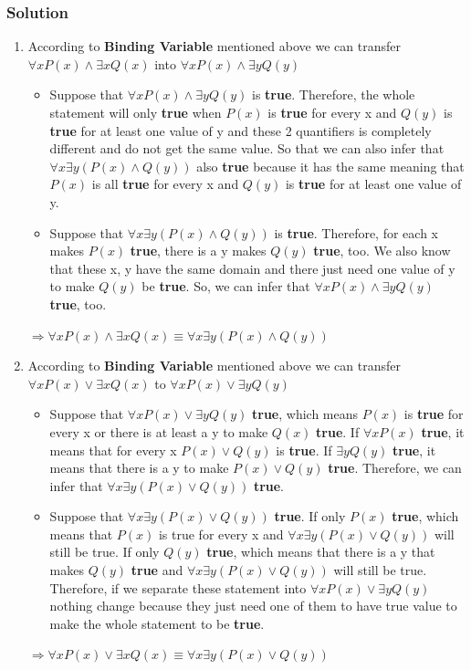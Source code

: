\documentclass{article}
\begin{document}
\subsubsection*{Solution}
\begin{enumerate} [label = (\alph*)]
    \item According to \textbf{Binding Variable} mentioned above we can transfer $\forall xP(x) \land \exists xQ(x)$ into $\forall xP(x) \land \exists yQ(y)$
          \begin{itemize}
              \item Suppose that $\forall xP(x) \land \exists yQ(y)$ is \textbf{true}. Therefore, the whole statement will only \textbf{true} when $P(x)$ is \textbf{true} for every x and $Q(y)$ is \textbf{true} for at least one value of y and these 2 quantifiers is completely different and do not get the same value. So that we can also infer that $\forall x\exists y(P(x) \land Q(y))$ also \textbf{true} because it has the same meaning that $P(x)$ is all \textbf{true} for every x and $Q(y)$ is \textbf{true} for at least one value of y.
              \item Suppose that $\forall x\exists y (P(x) \land Q(y))$ is \textbf{true}. Therefore, for each x makes $P(x)$ \textbf{true}, there is a y makes $Q(y)$ \textbf{true}, too. We also know that these x, y have the same domain and there just need one value of y to make $Q(y)$ be \textbf{true}. So, we can infer that $\forall xP(x) \land \exists yQ(y)$ \textbf{true}, too.
          \end{itemize}
          $\Rightarrow \forall xP(x) \land \exists xQ(x) \equiv \forall x\exists y (P(x) \land Q(y))$
    \item According to \textbf{Binding Variable} mentioned above we can transfer $\forall xP(x) \lor \exists xQ(x)$ to $\forall xP(x) \lor \exists yQ(y)$
          \begin{itemize}
              \item Suppose that $\forall xP(x) \lor \exists yQ(y)$ \textbf{true}, which means $P(x)$ is \textbf{true} for every x  or there is at least a y to make $Q(x)$ \textbf{true}. If $\forall xP(x)$ \textbf{true}, it means that for every x $P(x) \lor Q(y)$ is \textbf{true}. If $\exists yQ(y)$ \textbf{true}, it means that there is a y to make $P(x) \lor Q(y)$ \textbf{true}. Therefore, we can infer that $\forall x\exists y(P(x) \lor Q(y))$ \textbf{true}.
              \item Suppose that $\forall x\exists y(P(x) \lor Q(y))$ \textbf{true}. If only $P(x)$ \textbf{true}, which means that $P(x)$ is true for every x and $\forall x\exists y(P(x) \lor Q(y))$ will still be true. If only $Q(y)$ \textbf{true}, which means that there is a y that makes $Q(y)$ \textbf{true} and $\forall x\exists y(P(x) \lor Q(y))$ will still be true. Therefore, if we separate these statement into $\forall xP(x) \lor \exists yQ(y)$ nothing change because they just need one of them to have true value to make the whole statement to be \textbf{true}.
          \end{itemize}
          $\Rightarrow \forall xP(x) \lor \exists xQ(x) \equiv \forall x\exists y(P(x) \lor Q(y))$
\end{enumerate}
\end{document}
